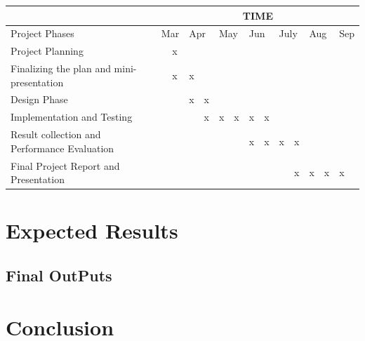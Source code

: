 \documentclass[titlepage]{report}
\begin{document}
\begin{table}[]
\begin{tabular}{|l|l|l|l|l|l|l|l|l|l|l|l|l|l|}
\hline
                                             & \multicolumn{13}{c|}{TIME}                                                                                                                                             \\ \hline
Project Phases                               & \multicolumn{2}{l|}{Mar} & \multicolumn{2}{l|}{Apr} & \multicolumn{2}{l|}{May} & \multicolumn{2}{l|}{Jun} & \multicolumn{2}{l|}{July} & \multicolumn{2}{l|}{Aug} & Sep \\ \hline
Project Planning                             &            & x           &             &            &             &            &             &            &             &             &             &            &     \\ \hline
Finalizing the plan and mini-presentation    &            & x           & x           &            &             &            &             &            &             &             &             &            &     \\ \hline
Design Phase                                 &            &             & x           & x          &             &            &             &            &             &             &             &            &     \\ \hline
Implementation and Testing                   &            &             &             & x          & x           & x          & x           & x          &             &             &             &            &     \\ \hline
Result collection and Performance Evaluation &            &             &             &            &             &            & x           & x          & x           & x           &             &            &     \\ \hline
Final Project Report and Presentation        &            &             &             &            &             &            &             &            &             & x           & x           & x          & x   \\ \hline
\end{tabular}
\end{table}


\chapter{Expected Results}


\section{Final OutPuts}




\chapter{Conclusion}



\end{document}
